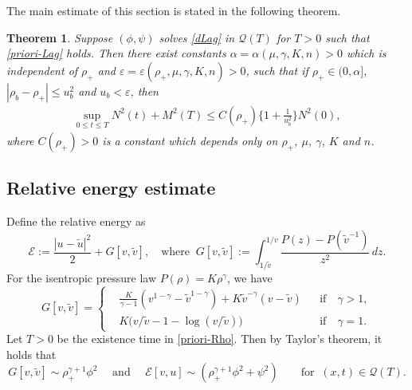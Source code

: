 \documentclass[a4paper,12pt,draft]{article}
\newtheorem{theorem}{Theorem}[section]
\theoremstyle{remark}
\def\ut{\tilde{u}}
\def\vt{\tilde{v}}
\def\ep{\varepsilon}
\def\mE{\mathcal{E}}
\def\mQ{\mathcal{Q}}
\newcommand{\qu}{\quad}
\begin{document}
The main estimate of this section is stated in the following theorem.
\begin{theorem}\label{thm:Lag}
    Suppose $(\phi,\psi)$ solves \eqref{dLag} in $\mQ(T)$ for $T>0$ such that \eqref{priori-Lag} holds. Then there exist constants $\alpha=\alpha(\mu,\gamma,K,n)>0$ which is independent of $\rho_+$ and $\ep=\ep(\rho_+,\mu,\gamma,K,n)>0$, such that if $\rho_+\in (0,\alpha]$, $|\rho_b-\rho_+|\le u_b^2$ and $u_b< \ep$, then
    \begin{align*}
        \sup\limits_{0\le t\le T} N^2(t) + M^2(T) \le C(\rho_+) \Big\{ 1 + \frac{1}{u_b^2} \Big\} N^2(0),
    \end{align*}
    where $C(\rho_+)>0$ is a constant which depends only on $\rho_+$, $\mu$, $\gamma$, $K$ and $n$.
\end{theorem}

\subsection{Relative energy estimate}\label{ssec:REE}
Define the relative energy as
\begin{equation}
    \mE := \dfrac{|u-\ut|^2}{2} + G[v,\vt], \qu \text{where } \ G[v,\vt]:= \int_{1/\vt}^{1/v} \dfrac{P(z)-P(\vt^{-1})}{z^2} \,d z.
\end{equation}
For the isentropic pressure law $P(\rho)=K \rho^{\gamma}$, we have
\begin{equation*}
    G[v,\vt] = \left\{\begin{aligned}
        &\tfrac{K}{\gamma-1} (v^{1-\gamma}-\vt^{1-\gamma}) + K \vt^{-\gamma} (v-\vt)  && \text{if} \qu \gamma>1,\\
    &K\big( v/\vt - 1 -\log (v/\vt) \big) && \text{if} \qu \gamma =1.
    \end{aligned}\right.
\end{equation*}
Let $T>0$ be the existence time in \eqref{priori-Rho}. Then by Taylor's theorem, it holds that
\begin{equation}\label{Gvv}
     G[v,\vt] %
     \sim  \rho_{+}^{\gamma+1} \phi^2
     \quad \text{ and } \quad \mE[v,u] \sim ( \rho_{+}^{\gamma+1}\phi^2 + \psi^2)  \qquad \text{for } \ (x,t)\in \mQ(T).
\end{equation}
\end{document}
